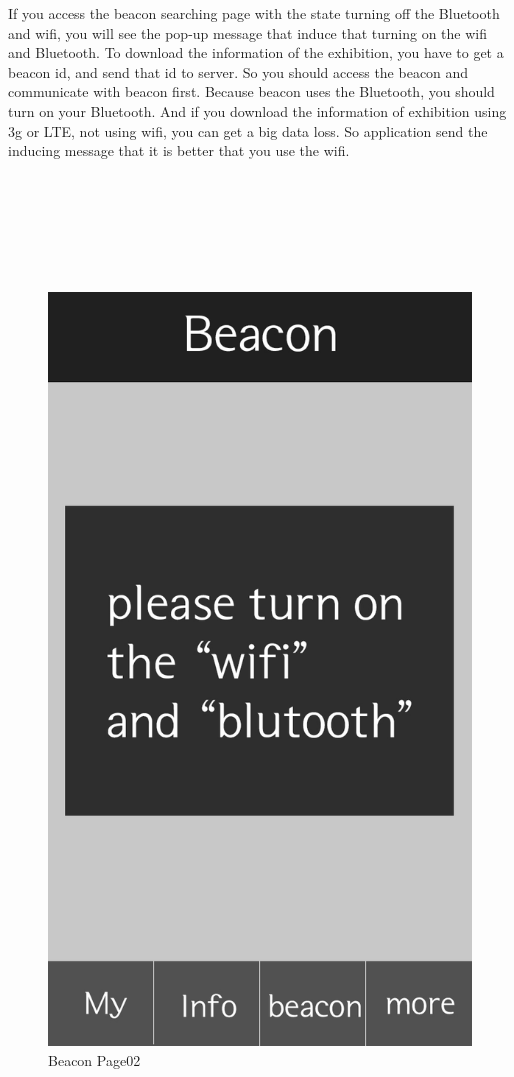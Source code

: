 \documentclass[conference]{IEEEtran}
\begin{document}
If you access the beacon searching page with the state turning off the Bluetooth and wifi, you will see the pop-up message that induce that turning on the wifi and Bluetooth. To download the information of the exhibition, you have to get a beacon id, and send that id to server. So you should access the beacon and communicate with beacon first. Because beacon uses the Bluetooth, you should turn on your Bluetooth. And if you download the information of exhibition using 3g or LTE, not using wifi, you can get a big data loss. 
So application send the inducing message that it is better that you use the wifi.\\\\\\\\\\\\\\

\begin{figure}[htbp]
\begin{center}
    \includegraphics[scale=0.15]{img_turnon}
    \caption{Beacon Page02} 
\end{center}
\end{figure}
\end{document}

